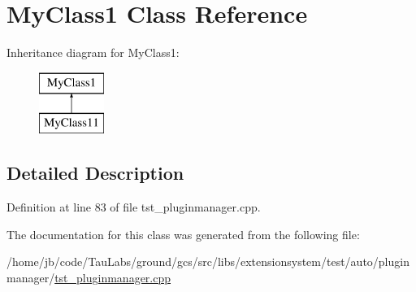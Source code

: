 \hypertarget{class_my_class1}{\section{\-My\-Class1 \-Class \-Reference}
\label{class_my_class1}
}
\-Inheritance diagram for \-My\-Class1\-:\begin{figure}[H]
\begin{center}
\leavevmode
\includegraphics[height=2.000000cm]{class_my_class1}
\end{center}
\end{figure}


\subsection{\-Detailed \-Description}


\-Definition at line 83 of file tst\-\_\-pluginmanager.\-cpp.



\-The documentation for this class was generated from the following file\-:\begin{DoxyCompactItemize}
\item 
/home/jb/code/\-Tau\-Labs/ground/gcs/src/libs/extensionsystem/test/auto/pluginmanager/\hyperlink{tst__pluginmanager_8cpp}{tst\-\_\-pluginmanager.\-cpp}\end{DoxyCompactItemize}
